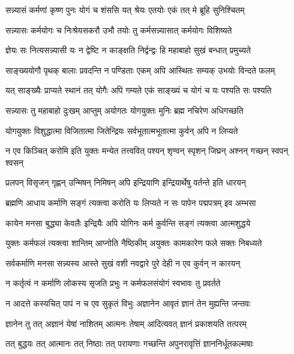 \twolineshloka
{सन्न्यासं कर्मणां कृष्ण पुनः योगं च शंससि}
{यत् श्रेयः एतयोः एकं तत् मे ब्रूहि सुनिश्चितम्}%


\twolineshloka
{सन्न्यासः कर्मयोगः च निःश्रेयसकरौ उभौ}
{तयोः तु कर्मसन्न्यासात् कर्मयोगः विशिष्यते}%

\twolineshloka
{ज्ञेयः सः नित्यसन्न्यासी यः न द्वेष्टि न काङ्क्षति}
{निर्द्वन्द्वः हि महाबाहो सुखं बन्धात् प्रमुच्यते}%

\twolineshloka
{साङ्ख्ययोगौ पृथक् बालाः प्रवदन्ति न पण्डिताः}
{एकम् अपि आस्थितः सम्यक् उभयोः विन्दते फलम्}%

\twolineshloka
{यत् साङ्ख्यैः प्राप्यते स्थानं तत् योगैः अपि गम्यते}
{एकं साङ्ख्यं च योगं च यः पश्यति सः पश्यति}%

\twolineshloka
{सन्न्यासः तु महाबाहो दुःखम् आप्तुम् अयोगतः}
{योगयुक्तः मुनिः ब्रह्म नचिरेण अधिगच्छति}%

\twolineshloka
{योगयुक्तः विशुद्धात्मा विजितात्मा जितेन्द्रियः}
{सर्वभूतात्मभूतात्मा कुर्वन् अपि न लिप्यते}%

\twolineshloka
{न एव किञ्चित् करोमि इति युक्तः मन्येत तत्त्ववित्}
{पश्यन् शृण्वन् स्पृशन् जिघ्रन् अश्नन् गच्छन् स्वपन् श्वसन्}%

\twolineshloka
{प्रलपन् विसृजन् गृह्णन् उन्मिषन् निमिषन् अपि}
{इन्द्रियाणि इन्द्रियार्थेषु वर्तन्ते इति धारयन्}%

\twolineshloka
{ब्रह्मणि आधाय कर्माणि सङ्गं त्यक्त्वा करोति यः}
{लिप्यते न सः पापेन पद्मपत्रम् इव अम्भसा}%

\twolineshloka
{कायेन मनसा बुद्ध्या केवलैः इन्द्रियैः अपि}
{योगिनः कर्म कुर्वन्ति सङ्गं त्यक्त्वा आत्मशुद्धये}%

\twolineshloka
{युक्तः कर्मफलं त्यक्त्वा शान्तिम् आप्नोति नैष्ठिकीम्}
{अयुक्तः कामकारेण फले सक्तः निबध्यते}%

\twolineshloka
{सर्वकर्माणि मनसा सन्न्यस्य आस्ते सुखं वशी}
{नवद्वारे पुरे देही न एव कुर्वन् न कारयन्}%

\twolineshloka
{न कर्तृत्वं न कर्माणि लोकस्य सृजति प्रभुः}
{न कर्मफलसंयोगं स्वभावः तु प्रवर्तते}%

\twolineshloka
{न आदत्ते कस्यचित् पापं न च एव सुकृतं विभुः}
{अज्ञानेन आवृतं ज्ञानं तेन मुह्यन्ति जन्तवः}%

\twolineshloka
{ज्ञानेन तु तत् अज्ञानं येषां नाशितम् आत्मनः}
{तेषाम् आदित्यवत् ज्ञानं प्रकाशयति तत्परम्}%

\twolineshloka
{तत् बुद्धयः तत् आत्मानः तत् निष्ठाः तत् परायणाः}
{गच्छन्ति अपुनरावृत्तिं ज्ञाननिर्धूतकल्मषाः}%

